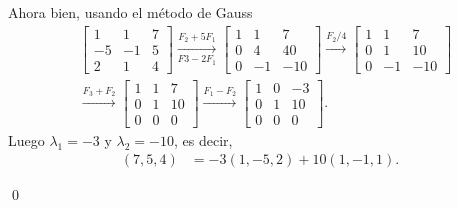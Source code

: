\documentclass[handout]{beamer} %
\begin{document}
    \begin{frame}
    Ahora bien, usando el método de Gauss
    \begin{align*}
        &\left[\begin{array}{rr|r}
        1 & 1 & 7 \\ -5 & -1 & 5 \\	2 & 1 & 4
        \end{array}\right] 
        \underset{F3-2F_1}{\stackrel{F_2+5F_1}{\longrightarrow}} 
        \left[\begin{array}{rr|r}
        1 & 1 & 7 \\ 0 & 4 & 40 \\	0 & -1 & -10
        \end{array}\right]\stackrel{F_2/4}{\longrightarrow}
        \left[\begin{array}{rr|r}
        1 & 1 & 7 \\ 0 & 1 & 10 \\	0 & -1 & -10
        \end{array}\right] \\
        &\stackrel{F_3+F_2}{\longrightarrow}
        \left[\begin{array}{rr|r}
        1 & 1 & 7 \\ 0 & 1 & 10 \\	0 & 0 & 0
        \end{array}\right] \stackrel{F_1-F_2}{\longrightarrow}
        \left[\begin{array}{rr|r}
        1 & 0 & -3 \\ 0 & 1 & 10 \\	0 & 0 & 0
        \end{array}\right].
    \end{align*}	
        Luego $\lambda_1= -3$ y $\lambda_2 = -10$,  es decir,
        \begin{align*}
        (7, 5, 4) &= -3(1,-5,2)+10 (1,-1,1).
        \end{align*} 

        \qed


\end{frame}
    
\end{document}
